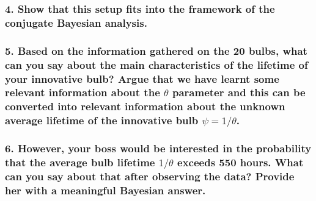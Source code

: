 \documentclass[
]{article}
\begin{document}
\hypertarget{show-that-this-setup-fits-into-the-framework-of-the-conjugate-bayesian-analysis.}{%
\subsubsection{4. Show that this setup fits into the framework of the
conjugate Bayesian
analysis.}\label{show-that-this-setup-fits-into-the-framework-of-the-conjugate-bayesian-analysis.}}

\hypertarget{based-on-the-information-gathered-on-the-20-bulbs-what-can-you-say-about-the-main-characteristics-of-the-lifetime-of-your-innovative-bulb-argue-that-we-have-learnt-some-relevant-information-about-the-theta-parameter-and-this-can-be-converted-into-relevant-information-about-the-unknown-average-lifetime-of-the-innovative-bulb-psi1theta.}{%
\subsubsection{\texorpdfstring{5. Based on the information gathered on
the 20 bulbs, what can you say about the main characteristics of the
lifetime of your innovative bulb? Argue that we have learnt some
relevant information about the \(\theta\) parameter and this can be
converted into relevant information about the unknown average lifetime
of the innovative bulb
\(\psi=1/\theta\).}{5. Based on the information gathered on the 20 bulbs, what can you say about the main characteristics of the lifetime of your innovative bulb? Argue that we have learnt some relevant information about the \textbackslash theta parameter and this can be converted into relevant information about the unknown average lifetime of the innovative bulb \textbackslash psi=1/\textbackslash theta.}}\label{based-on-the-information-gathered-on-the-20-bulbs-what-can-you-say-about-the-main-characteristics-of-the-lifetime-of-your-innovative-bulb-argue-that-we-have-learnt-some-relevant-information-about-the-theta-parameter-and-this-can-be-converted-into-relevant-information-about-the-unknown-average-lifetime-of-the-innovative-bulb-psi1theta.}}

\hypertarget{however-your-boss-would-be-interested-in-the-probability-that-the-average-bulb-lifetime-1theta-exceeds-550-hours.-what-can-you-say-about-that-after-observing-the-data-provide-her-with-a-meaningful-bayesian-answer.}{%
\subsubsection{\texorpdfstring{6. However, your boss would be interested
in the probability that the average bulb lifetime \(1/\theta\) exceeds
550 hours. What can you say about that after observing the data? Provide
her with a meaningful Bayesian
answer.}{6. However, your boss would be interested in the probability that the average bulb lifetime 1/\textbackslash theta exceeds 550 hours. What can you say about that after observing the data? Provide her with a meaningful Bayesian answer.}}\label{however-your-boss-would-be-interested-in-the-probability-that-the-average-bulb-lifetime-1theta-exceeds-550-hours.-what-can-you-say-about-that-after-observing-the-data-provide-her-with-a-meaningful-bayesian-answer.}}
\end{document}
